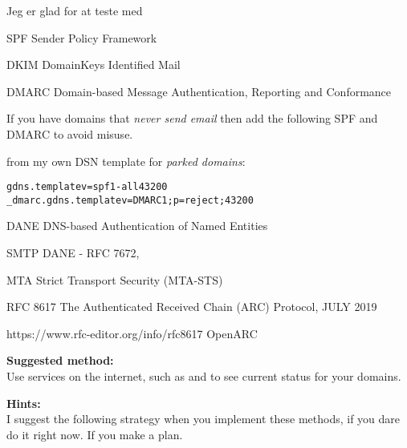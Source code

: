 \documentclass[Screen16to9,17pt]{foils}
\begin{document}
\centerline{Jeg er glad for at teste med }



 SPF Sender Policy Framework\\ {\footnotesize{}}



 DKIM DomainKeys Identified Mail\\
 {\footnotesize{}}



%

DMARC Domain-based Message Authentication, Reporting and Conformance\\
{\footnotesize{}}


If you have domains that \emph{never send email} then add the following SPF and DMARC to avoid misuse.

from my own DSN template for \emph{parked domains}:
\begin{alltt}
gdns.template   v=spf1 -all     43200
_dmarc.gdns.template    v=DMARC1; p=reject;     43200
\end{alltt}


 DANE DNS-based Authentication of Named Entities\\ {\footnotesize{}}

SMTP DANE - RFC 7672,


MTA Strict Transport Security (MTA-STS)

RFC 8617
The Authenticated Received Chain (ARC) Protocol, JULY 2019

https://www.rfc-editor.org/info/rfc8617
OpenARC


{\bf Suggested method:}\\
Use services on the internet, such as  and  to see current status for your domains.

{\bf Hints:}\\
I suggest the following strategy when you implement these methods, if you dare do it right now. If you make a plan.
\end{document}
